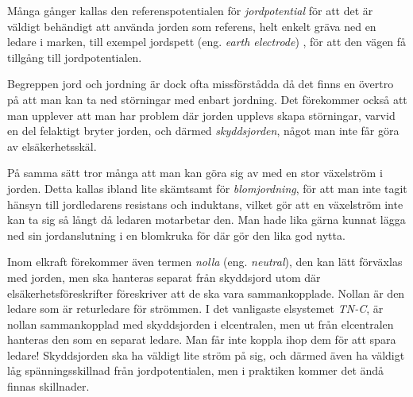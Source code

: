 Många gånger kallas den referenspotentialen för \emph{jordpotential} för att
det är väldigt behändigt att använda jorden som referens, helt enkelt gräva ned
en ledare i marken, till exempel jordspett (eng. \emph{earth electrode})
\cite[kap 3.1.2]{K27-1991}, för att den vägen få tillgång till jordpotentialen.

Begreppen jord och jordning är dock ofta missförstådda då det finns en övertro
på att man kan ta ned störningar med enbart jordning.
Det förekommer också att man upplever att man har problem där jorden upplevs
skapa störningar, varvid en del felaktigt bryter jorden, och därmed
\emph{skyddsjorden}, något man inte får göra av elsäkerhetsskäl.

På samma sätt tror många att man kan göra sig av med en stor växelström i
jorden.
Detta kallas ibland lite skämtsamt för \emph{blomjordning}, för att man inte
tagit hänsyn till jordledarens resistans och induktans, vilket gör att en
växelström inte kan ta sig så långt då ledaren motarbetar den.
Man hade lika gärna kunnat lägga ned sin jordanslutning i en blomkruka för där
gör den lika god nytta.

Inom elkraft förekommer även termen \emph{nolla} (eng. \emph{neutral}), den
kan lätt förväxlas med jorden, men ska hanteras separat från skyddsjord utom
där elsäkerhetsföreskrifter föreskriver att de ska vara sammankopplade.
Nollan är den ledare som är returledare för strömmen.
I det vanligaste elsystemet \emph{TN-C}, är nollan sammankopplad med skyddsjorden
i elcentralen, men ut från elcentralen hanteras den som en separat ledare.
Man får inte koppla ihop dem för att spara ledare!
Skyddsjorden ska ha väldigt lite ström på sig, och därmed även ha väldigt
låg spänningsskillnad från jordpotentialen, men i praktiken kommer det ändå
finnas skillnader.


